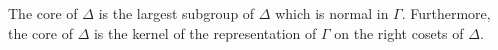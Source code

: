 The core of $\Delta$ is the largest subgroup of $\Delta$ which is normal in $\Gamma$. Furthermore, the core of $\Delta$ is the kernel of the representation of $\Gamma$ on the right cosets of $\Delta$.

